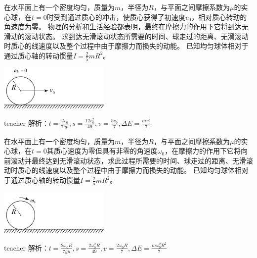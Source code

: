 \begin{example}
在水平面上有一个密度均匀，质量为$m$，半径为$R$，与平面之间摩擦系数为$\mu$的实心球，在$t=0$时受到通过质心的冲击，使质心获得了初速度$v_0$，相对质心转动的角速度为零。
物理的分析和生活经验都表明，最终在摩擦力的作用下它将到达无滑动的滚动状态。
求到达无滑滚动状态所需要的时间、球走过的距离、无滑滚动时质心的线速度以及整个过程中由于摩擦力而损失的动能。
已知均匀球体相对于通过质心轴的转动惯量$I=\frac{2}{5}mR^2$。
\begin{flushright}
\includegraphics[width=0.4\textwidth]{images/rb-problem-2.pdf}
\end{flushright}
\begin{taggedblock}{teacher}
\noindent
解析：$t=\frac{2v_0}{7g\mu},s=\frac{12v_0^2}{49},v=\frac{5v_0}{7},\Delta E=\frac{mv_0^2}{7}$
\end{taggedblock}
\end{example}


\begin{example}
在水平面上有一个密度均匀，质量为$m$，半径为$R$，与平面之间摩擦系数为$\mu$的实心球，在$t=0$其质心速度为零但具有非零的角速度$\omega_0$，在摩擦力的作用下它将向前滚动并最终达到无滑滚动状态，求此过程所需要的时间、球走过的距离、无滑滚动时质心的线速度以及整个过程中由于摩擦力而损失的动能。
已知均匀球体相对于通过质心轴的转动惯量$I=\frac{2}{5}mR^2$。
\begin{flushright}
\includegraphics[width=0.4\textwidth]{images/rb-problem-3.pdf}
\end{flushright}
\begin{taggedblock}{teacher}
\noindent
解析：$t=\frac{2\omega_0R}{7g\mu},s=\frac{2\omega_0^2R}{49},v=\frac{2\omega_0R}{7},\Delta E=\frac{m\omega_0^2R^2}{7}$
\end{taggedblock}
\end{example}


